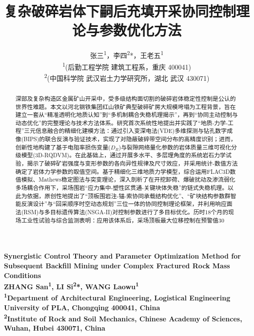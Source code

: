 \documentclass[twocolumn,a4paper,10pt]{article}
\begin{document}
\title{\bfseries 复杂破碎岩体下嗣后充填开采协同控制理论与参数优化方法}
\author{张三\textsuperscript{1}，李四\textsuperscript{2}*，王老五\textsuperscript{1} \\
\smallskip
\textsuperscript{1}(后勤工程学院 建筑工程系，重庆 400041) \\
\textsuperscript{2}(中国科学院 武汉岩土力学研究所，湖北 武汉 430071)
}
\date{}
\maketitle

\begin{center}
\bfseries Synergistic Control Theory and Parameter Optimization Method for Subsequent Backfill Mining under Complex Fractured Rock Mass Conditions \\
\vspace{6pt}
\small ZHANG San\textsuperscript{1}, LI Si\textsuperscript{2}*, WANG Laowu\textsuperscript{1} \\
\vspace{3pt}
\small \textsuperscript{1}Department of Architectural Engineering, Logistical Engineering University of PLA, Chongqing 400041, China \\
\small \textsuperscript{2}Institute of Rock and Soil Mechanics, Chinese Academy of Sciences, Wuhan, Hubei 430071, China
\end{center}

\begin{abstract}
\small 深部及复杂构造区金属矿山开采中，受多级结构面切割的破碎岩体稳定性控制是公认的世界性难题。本文以河北钢铁集团红山铁矿典型破碎矿房大规模垮塌为工程背景，旨在建立一套从“精准透明化地质认知”到“多机制耦合失稳机理揭示”，再到“协同主动控制与动态优化”的完整理论与技术方法体系。研究首次系统性地提出并实践了“地质-力学-工程”三元信息融合的精细化建模方法：通过引入变深电法(VDE)多维探测与钻孔数字成像(BIPS)的联合反演与验证技术，实现了对隐蔽破碎带空间分布的高精度识别；进而，创新性地构建了基于电阻率损伤变量($D_R$)与裂隙网络量化参数的岩体质量三维可视化分级模型(3D-RQDVM)。在此基础上，通过开展多水平、多层理角度的系统岩石力学试验，揭示了破碎矿岩强度与变形参数的各向异性规律及尺寸效应，并采用统计-数值方法确定了岩体力学参数的取值空间。基于精细化三维地质力学模型，综合运用FLAC3D数值模拟、Mathews稳定图法与突变理论，深入剖析了在开挖卸荷、爆破扰动及渗流弱化多场耦合作用下，采场围岩“应力集中-塑性区贯通-关键块体失稳”的链式失稳机理。以此为依据，原创性地提出了“顶板围岩注-锚-索协同承载结构优化”、“矿块结构参数群智能反演设计”与“回采顺序时空动态规划”三位一体的协同控制理论框架，并利用响应面法(RSM)与多目标遗传算法(NSGA-II)对控制参数进行了多目标优化。历时18个月的现场工业性试验与综合监测表明：应用该体系后，采场顶板最大位移控制在预警值30%
\end{abstract}
\end{document}
